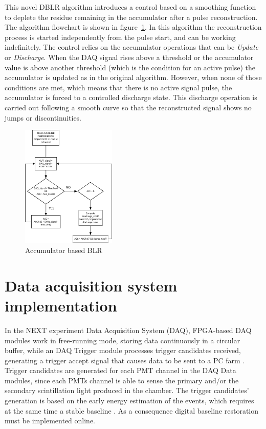 \documentclass[a4paper, 10pt, oneside, twocolumn, 3p]{elsarticle}
\begin{document}
\par This novel DBLR algorithm introduces a control based on a smoothing function to deplete the residue remaining in the accumulator after a pulse reconstruction. The algorithm flowchart is shown in figure~\ref{fig:BLR_acc_algor}. In this algorithm the reconstruction process is started independently from the pulse start, and can be working indefinitely. The control relies on the accumulator operations that can be \emph{Update} or \emph{Discharge}. When the DAQ signal rises above a  threshold or the accumulator value is above another threshold (which is the condition for an active pulse) the accumulator is updated as in the original algorithm. However, when none of those conditions are met, which means that there is no active signal pulse, the accumulator is forced to a controlled discharge state. This discharge operation is carried out following a smooth curve so that the reconstructed signal shows no jumps or discontinuities.


\begin{figure}[H]
	\begin{center}
		\includegraphics[width=0.4\textwidth]{./figures/BLR_acc_algo.pdf}
		\caption{Accumulator based BLR}
		\label{fig:BLR_acc_algor}
	\end{center}
\end{figure}

\section{Data acquisition system implementation}

\par In the NEXT experiment Data Acquisition System (DAQ), FPGA-based DAQ modules work in free-running mode, storing data continuously in a circular buffer, while an DAQ Trigger module processes trigger candidates received, generating a trigger accept signal that causes data to be sent to a PC farm \cite{1748-0221-11-01-C01008}. Trigger candidates are generated for each PMT channel in the DAQ Data modules, since each PMTs channel is able to sense the primary and/or the secondary scintillation light produced in the chamber. The trigger candidates’ generation is based on the early energy estimation of the events, which requires at the same time a stable baseline \cite{1748-0221-7-12-C12001}. As a consequence digital baseline restoration must be implemented online.
\end{document}
